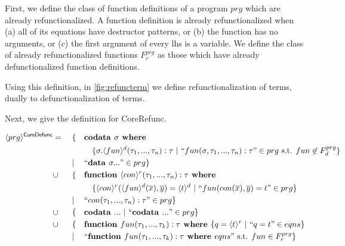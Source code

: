 First, we define the class of function definitions of a program $prg$ which are already refunctionalized. A function definition is already refunctionalized when (a) all of its equations have destructor patterns, or (b) the function has no arguments, or (c) the first argument of every lhs is a variable. We define the class of already refunctionalized functions $F^{prg}_r$ as those which have already defunctionalized function definitions.

Using this definition, in \autoref{fig:refuncterm} we define refunctionalization of terms, dually to defunctionalization of terms.

Next, we give the definition for \textsf{CoreRefunc}.

\begin{algorithm}

\begin{align*}
\langle prg \rangle^{\textsf{CoreDefunc}} & = ~&& \{ && \textrm{\textbf{codata }} \sigma \textrm{\textbf{ where }} \span\span\span\span \\
& && && && \{ \sigma.\langle fun \rangle^d (\tau_1, ..., \tau_n): \tau ~ | ~ `` fun(\sigma, \tau_1, ..., \tau_n): \tau " \in prg \text{ s.t. } fun \not\in F^{prg}_d \} \\
& && | && `` \textrm{\textbf{data }} \sigma ... " \in prg \} \span\span\span\span \\
& \cup && \{ && \textrm{\textbf{function }} \langle con \rangle^r (\tau_1, ..., \tau_n): \tau \textrm{\textbf{ where}} \span\span\span\span \\
& && && && \{ \langle con \rangle^r (\langle fun \rangle^d (\overline{x}), \overline{y}) = \langle t \rangle^d ~ | ~ `` fun(con(\overline{x}), \overline{y}) = t " \in prg \} \\
& && | && `` con(\tau_1, ..., \tau_n): \tau " \in prg \} \span\span\span\span \\
& \cup && \{ && \textrm{\textbf{codata }} ... ~ | ~ `` \textrm{\textbf{codata }} ... " \in prg \} \span\span\span\span \\
& \cup && \{ && \textrm{\textbf{function }} fun(\tau_1, ..., \tau_k): \tau \textrm{\textbf{ where }} \{ q = \langle t \rangle^r ~ | ~ ``q = t" \in eqns \} \span\span\span\span \\
& && | && `` \textrm{\textbf{function }} fun(\tau_1, ..., \tau_k): \tau \textrm{\textbf{ where }} eqns " \text{ s.t. } fun \in F^{prg}_r \} \span\span\span\span
\end{align*}

\end{algorithm}

